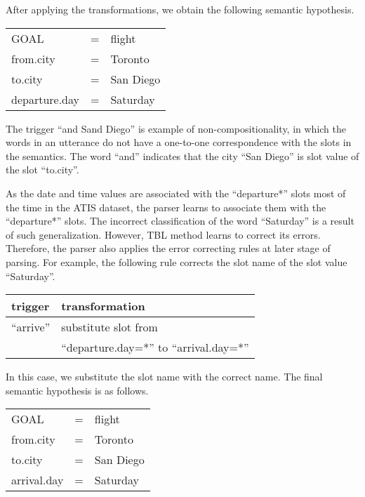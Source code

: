 \documentclass{article}
\begin{document}
After applying the transformations, we obtain the following semantic hypothesis. 

\vspace{.15cm}
\begin{tabular}{lll}
  GOAL          & = & flight \\
  from.city     & = & Toronto \\
  to.city       & = & San Diego \\
  departure.day & = & Saturday \\
\end{tabular} 
\vspace{.15cm}

The trigger ``and Sand Diego'' is example of non-compositionality, in which the words in an utterance do not have a one-to-one correspondence with the slots in the semantics. The word ``and'' indicates that the city ``San Diego'' is slot value of the slot ``to.city''. 


As the date and time values are associated with the ``departure*'' slots most of the time in the ATIS dataset,  
the parser learns to associate them with the ``departure*'' slots. The incorrect classification of the word ``Saturday'' is a result of such generalization. 
However, TBL method learns to correct its errors. Therefore, the parser also applies the error correcting rules at later stage of parsing. For example, the following rule corrects the slot name of the slot value ``Saturday''.

\vspace{.15cm}
\begin{tabular}{ll}
  trigger & transformation \\
  \hline 
  ``arrive''            & substitute slot from\\
                        & ``departure.day=*'' to ``arrival.day=*'' \\
\end{tabular} 
\vspace{.15cm}

In this case, we substitute the slot name with the correct name. The final semantic hypothesis is as follows.

\vspace{.15cm}
\begin{tabular}{lll}
  GOAL          & = & flight \\
  from.city     & = & Toronto \\
  to.city       & = & San Diego \\
  arrival.day    & = & Saturday \\
\end{tabular} 
\vspace{.15cm}
\end{document}
